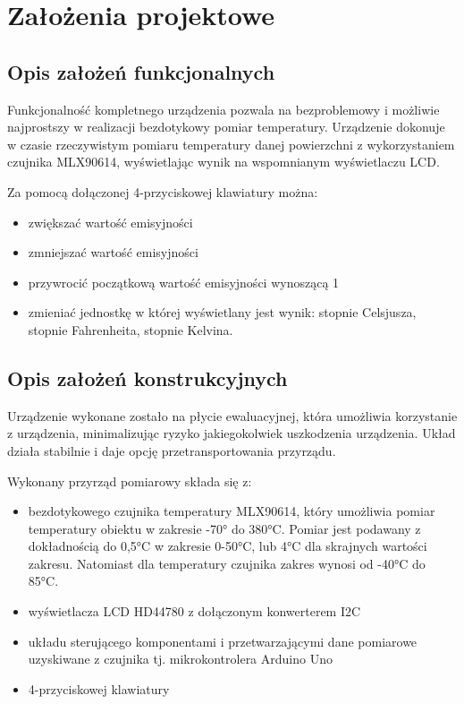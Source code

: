 \chapter{Założenia projektowe}

    \section{Opis założeń funkcjonalnych}

    Funkcjonalność kompletnego urządzenia pozwala na bezproblemowy i możliwie najprostszy w realizacji bezdotykowy pomiar temperatury. Urządzenie dokonuje w czasie rzeczywistym pomiaru temperatury danej powierzchni z wykorzystaniem czujnika MLX90614, wyświetlając wynik na wspomnianym wyświetlaczu LCD. 
    
    \vspace{12pt}

    Za pomocą dołączonej 4-przyciskowej klawiatury można:

    \begin{itemize}

        \item zwiększać wartość emisyjności
        \item zmniejszać wartość emisyjności
        \item przywrocić początkową wartość emisyjności wynoszącą 1
        \item zmieniać jednostkę w której wyświetlany jest wynik: stopnie Celsjusza, stopnie Fahrenheita, stopnie Kelvina.

    \end{itemize}

    \section{Opis założeń konstrukcyjnych}
    
    Urządzenie wykonane zostało na płycie ewaluacyjnej, która umożliwia korzystanie z urządzenia, minimalizując ryzyko jakiegokolwiek uszkodzenia urządzenia. Układ działa stabilnie i daje opcję przetransportowania przyrządu.

    \vspace{12pt}

    Wykonany przyrząd pomiarowy składa się z:

    \begin{itemize}

        \item bezdotykowego czujnika temperatury MLX90614, który umożliwia pomiar temperatury obiektu w zakresie -70° do 380°C. Pomiar jest podawany z dokładnością do 0,5°C w zakresie 0-50°C, lub 4°C dla skrajnych wartości zakresu. Natomiast dla temperatury czujnika zakres wynosi od -40°C do 85°C.
        \item wyświetlacza LCD HD44780 z dołączonym konwerterem I2C
        \item układu sterującego komponentami i przetwarzającymi dane pomiarowe uzyskiwane z czujnika tj. mikrokontrolera Arduino Uno
        \item 4-przyciskowej klawiatury 

    \end{itemize}

